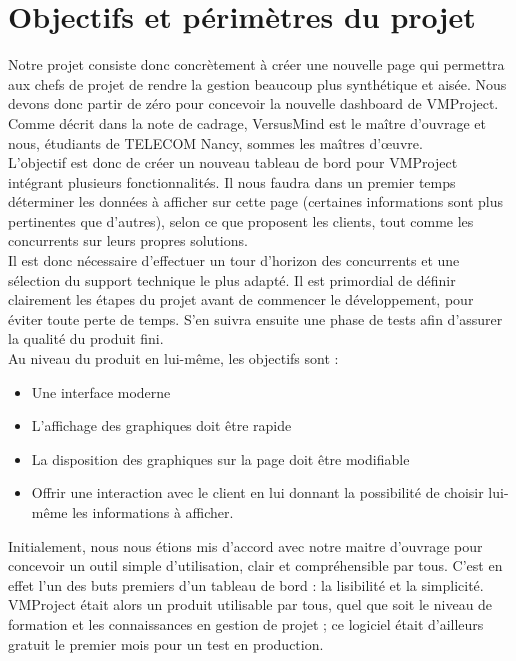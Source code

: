 \documentclass[12pt]{report}
\begin{document}
  \section{Objectifs et périmètres du projet}
  
Notre projet consiste donc concrètement à créer une nouvelle page qui permettra aux chefs de projet de rendre la gestion beaucoup plus synthétique et aisée. Nous devons donc partir de zéro pour concevoir la nouvelle dashboard de VMProject. Comme décrit dans la note de cadrage, VersusMind est le maître d’ouvrage et nous, étudiants de TELECOM Nancy, sommes les maîtres d’œuvre.\\
L’objectif est donc de créer un nouveau tableau de bord pour VMProject intégrant plusieurs fonctionnalités. Il nous faudra dans un premier temps déterminer les données à afficher sur cette page (certaines informations sont plus pertinentes que d’autres), selon ce que proposent les clients, tout comme les concurrents sur leurs propres solutions.\\
Il est donc nécessaire d’effectuer un tour d’horizon des concurrents et une sélection du support technique le plus adapté. Il est primordial de définir clairement les étapes du projet avant de commencer le développement, pour éviter toute perte de temps. S’en suivra ensuite une phase de tests afin d’assurer la qualité du produit fini.\\
Au niveau du produit en lui-même, les objectifs sont :\\
\begin{itemize}
\item Une interface moderne
\item L’affichage des graphiques doit être rapide
\item La disposition des graphiques sur la page doit être modifiable
\item Offrir une interaction avec le client en lui donnant la possibilité de choisir lui-même les informations à afficher.\\
\end{itemize}
Initialement, nous nous étions mis d’accord avec notre maitre d’ouvrage pour concevoir un outil simple d’utilisation, clair et compréhensible par tous. C’est en effet l’un des buts premiers d’un tableau de bord : la lisibilité et la simplicité. VMProject était alors un produit utilisable par tous, quel que soit le niveau de formation et les connaissances en gestion de projet ; ce logiciel était d’ailleurs gratuit le premier mois pour un test en production.\\
\end{document}
